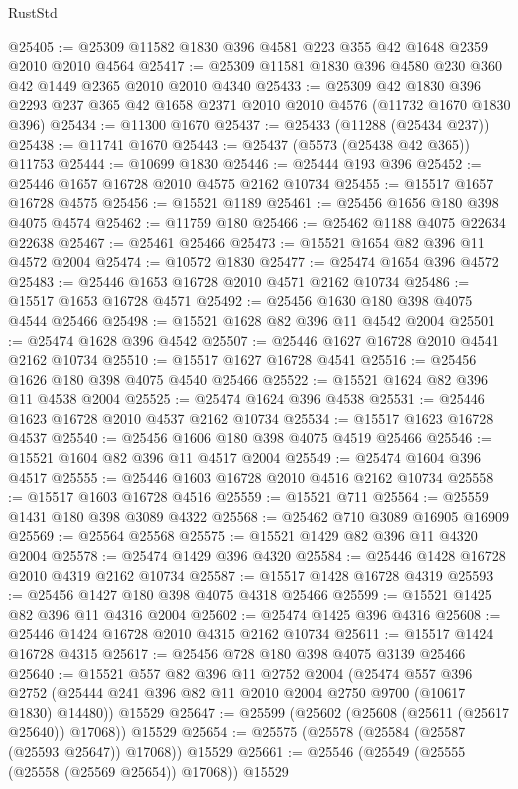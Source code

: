 \begin{lexlean}{RustStd}
\begin{coremodule}
@25405 := @25309 @11582 @1830 @396 @4581 @223 @355 @42 @1648 @2359 @2010 @2010 @4564
@25417 := @25309 @11581 @1830 @396 @4580 @230 @360 @42 @1449 @2365 @2010 @2010 @4340
@25433 := @25309
    @42
    @1830
    @396
    @2293
    @237
    @365
    @42
    @1658
    @2371
    @2010
    @2010
    @4576
    (@11732 @1670 @1830 @396)
@25434 := @11300 @1670
@25437 := @25433 (@11288 (@25434 @237))
@25438 := @11741 @1670
@25443 := @25437 (@5573 (@25438 @42 @365)) @11753
@25444 := @10699 @1830
@25446 := @25444 @193 @396
@25452 := @25446 @1657 @16728 @2010 @4575 @2162 @10734
@25455 := @15517 @1657 @16728 @4575
@25456 := @15521 @1189
@25461 := @25456 @1656 @180 @398 @4075 @4574
@25462 := @11759 @180
@25466 := @25462 @1188 @4075 @22634 @22638
@25467 := @25461 @25466
@25473 := @15521 @1654 @82 @396 @11 @4572 @2004
@25474 := @10572 @1830
@25477 := @25474 @1654 @396 @4572
@25483 := @25446 @1653 @16728 @2010 @4571 @2162 @10734
@25486 := @15517 @1653 @16728 @4571
@25492 := @25456 @1630 @180 @398 @4075 @4544 @25466
@25498 := @15521 @1628 @82 @396 @11 @4542 @2004
@25501 := @25474 @1628 @396 @4542
@25507 := @25446 @1627 @16728 @2010 @4541 @2162 @10734
@25510 := @15517 @1627 @16728 @4541
@25516 := @25456 @1626 @180 @398 @4075 @4540 @25466
@25522 := @15521 @1624 @82 @396 @11 @4538 @2004
@25525 := @25474 @1624 @396 @4538
@25531 := @25446 @1623 @16728 @2010 @4537 @2162 @10734
@25534 := @15517 @1623 @16728 @4537
@25540 := @25456 @1606 @180 @398 @4075 @4519 @25466
@25546 := @15521 @1604 @82 @396 @11 @4517 @2004
@25549 := @25474 @1604 @396 @4517
@25555 := @25446 @1603 @16728 @2010 @4516 @2162 @10734
@25558 := @15517 @1603 @16728 @4516
@25559 := @15521 @711
@25564 := @25559 @1431 @180 @398 @3089 @4322
@25568 := @25462 @710 @3089 @16905 @16909
@25569 := @25564 @25568
@25575 := @15521 @1429 @82 @396 @11 @4320 @2004
@25578 := @25474 @1429 @396 @4320
@25584 := @25446 @1428 @16728 @2010 @4319 @2162 @10734
@25587 := @15517 @1428 @16728 @4319
@25593 := @25456 @1427 @180 @398 @4075 @4318 @25466
@25599 := @15521 @1425 @82 @396 @11 @4316 @2004
@25602 := @25474 @1425 @396 @4316
@25608 := @25446 @1424 @16728 @2010 @4315 @2162 @10734
@25611 := @15517 @1424 @16728 @4315
@25617 := @25456 @728 @180 @398 @4075 @3139 @25466
@25640 := @15521
    @557
    @82
    @396
    @11
    @2752
    @2004
    (@25474
      @557
      @396
      @2752
      (@25444 @241 @396 @82 @11 @2010 @2004 @2750 @9700 (@10617 @1830) @14480))
    @15529
@25647 := @25599 (@25602 (@25608 (@25611 (@25617 @25640)) @17068)) @15529
@25654 := @25575 (@25578 (@25584 (@25587 (@25593 @25647)) @17068)) @15529
@25661 := @25546 (@25549 (@25555 (@25558 (@25569 @25654)) @17068)) @15529

\end{coremodule}
\end{lexlean}
